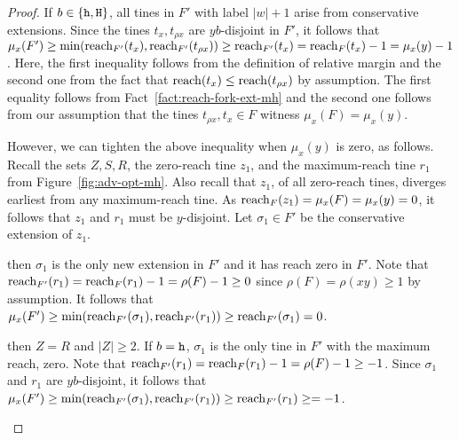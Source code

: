 \begin{proof}
  If $b \in \{\mathtt{h}, \mathtt{H}\}$, 
  all tines in $F'$ with label $|w| + 1$ arise from conservative extensions. 
  Since the tines $t_x, t_{\rho x}$ are $yb$-disjoint in $F'$, 
  it follows that $\mu_x(F') \geq \min(\operatorname{reach}_{F'}(t_x), \operatorname{reach}_{F'}(t_{\rho x})) \geq \operatorname{reach}_{F'}(t_x) = \operatorname{reach}_{F}(t_x) - 1 = \mu_x(y) - 1$. 
  Here, the first inequality follows from the definition of relative margin and 
  the second one from the fact that $\operatorname{reach}(t_x) \leq \operatorname{reach}(t_{\rho x})$ by assumption. 
  The first equality follows from Fact~\ref{fact:reach-fork-ext-mh} and 
  the second one follows from our assumption that the tines $t_{\rho x}, t_x\in F$ witness $\mu_x(F) = \mu_x(y)$. 

  However, we can tighten the above inequality when $\mu_x(y)$ is zero, as follows. 
  Recall the sets $Z, S, R$, 
  the zero-reach tine $z_1$, 
  and the maximum-reach tine $r_1$ 
  from Figure~\ref{fig:adv-opt-mh}. 
  Also recall that $z_1$, of all zero-reach tines, 
  diverges earliest from any maximum-reach tine.
  As $\operatorname{reach}_F(z_1) = \mu_x(F) = \mu_x(y) = 0$, 
  it follows that 
  $z_1$ and $r_1$ must be $y$-disjoint.
  Let $\sigma_1 \in F'$ be the conservative extension of $z_1$.


  \begin{description}[font=\normalfont\itshape\space]
    \item[If $\rho(xy) \geq 1$ and $\mu_x(y) = 0$]
      then $\sigma_1$ is the only new extension in $F'$ 
      and it has reach zero in $F'$.
      Note that 
      $\operatorname{reach}_{F'}(r_1) = \operatorname{reach}_F(r_1) - 1 = \rho(F) - 1 \geq 0$ 
      since $\rho(F) = \rho(xy) \geq 1$ by assumption. 
      It follows that $\mu_x(F') \geq \min(\operatorname{reach}_{F'}(\sigma_1), \operatorname{reach}_{F'}(r_1) ) \geq \operatorname{reach}_{F'}(\sigma_1) = 0$. 




    \item[If $\rho(xy) = 0$ and $\mu_x(y) = 0$] 
      then $Z = R$ and $|Z| \geq 2$. 
      If $b = \mathtt{h}$, 
      $\sigma_1$
      is the only tine in $F'$ with the maximum reach, zero. 
      Note that 
      $\operatorname{reach}_{F'}(r_1) = \operatorname{reach}_F(r_1) - 1 = \rho(F) - 1 \geq -1$. 
      Since $\sigma_1$ and $r_1$ are $yb$-disjoint, 
      it follows that 
      $\mu_x(F') \geq \min(\operatorname{reach}_{F'}(\sigma_1), \operatorname{reach}_{F'}(r_1) ) 
      \geq \operatorname{reach}_{F'}(r_1) \geq = -1$.


\end{description}
\end{proof}
